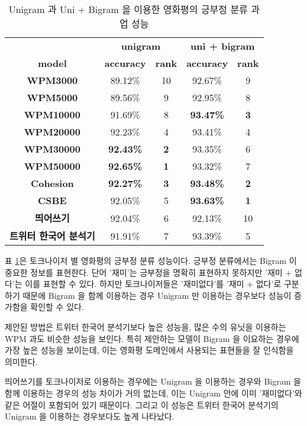 \documentclass[oneside, ko,phd]{snuthesis_utf8_kor}
\begin{document}
\begin{table}[ht]
\centering
\caption{Unigram 과 Uni + Bigram 을 이용한 영화평의 긍부정 분류 과업 성능}
\label{tab:sentiment_performance}
\begin{tabular}{|
>{}c |c|c|c|c|}
\hline
 & \multicolumn{2}{c|}{\textbf{unigram}} & \multicolumn{2}{c|}{\textbf{uni + bigram}} \\ \cline{2-5} 
\multirow{-2}{*}{\textbf{model}} & \textbf{accuracy} & \textbf{rank} & \textbf{accuracy} & \textbf{rank} \\ \hline
\textbf{WPM3000} & 89.12\% & 10 & 92.67\% & 9 \\ \hline
\textbf{WPM5000} & 89.56\% & 9 & 92.95\% & 8 \\ \hline
\textbf{WPM10000} & 91.69\% & 8 & {\textbf{93.47\%}} & {\textbf{3}} \\ \hline
\textbf{WPM20000} & 92.23\% & 4 & 93.41\% & 4 \\ \hline
\textbf{WPM30000} & {\textbf{92.43\%}} & {\textbf{2}} & 93.35\% & 6 \\ \hline
\textbf{WPM50000} & {\textbf{92.65\%}} & {\textbf{1}} & 93.32\% & 7 \\ \hline
\textbf{Cohesion} & {\textbf{92.27\%}} & {\textbf{3}} & {\textbf{93.48\%}} & {\textbf{2}} \\ \hline
\textbf{CSBE} & 92.05\% & 5 & {\textbf{93.63\%}} & {\textbf{1}} \\ \hline
\textbf{띄어쓰기} & 92.04\% & 6 & 92.13\% & 10 \\ \hline
\textbf{트위터 한국어 분석기} & 91.91\% & 7 & 93.39\% & 5 \\ \hline
\end{tabular}%
\end{table}

표 \ref{tab:sentiment_performance}은 토크나이저 별 영화평의 긍부정 분류 성능이다.
긍부정 분류에서는 Bigram 이 중요한 정보를 표현한다.
단어 '재미'는 긍부정을 명확히 표현하지 못하지만 '재미 + 없다'는 이를 표현할 수 있다.
하지만 토크나이저들은 '재미없다'를 '재미 + 없다'로 구분하기 때문에 Bigram 을 함께 이용하는 경우 Unigram 만 이용하는 경우보다 성능이 증가함을 확인할 수 있다.

제안된 방법은 트위터 한국어 분석기보다 높은 성능을, 많은 수의 유닛을 이용하는 WPM 과도 비슷한 성능을 보인다.
특히 제안하는 모델이 Bigram 을 이요하는 경우에 가장 높은 성능을 보이는데, 이는 영화평 도메인에서 사용되는 표현들을 잘 인식함을 의미한다.

띄어쓰기를 토크나이저로 이용하는 경우에는 Unigram 을 이용하는 경우와 Bigram 을 함께 이용하는 경우의 성능 차이가 거의 없는데, 이는 Unigram 안에 이미 '재미없다'와 같은 어절이 포함되어 있기 때문이다.
그리고 이 성능은 트위터 한국어 분석기의 Unigram 을 이용하는 경우보다도 높게 나타났다.
\end{document}
